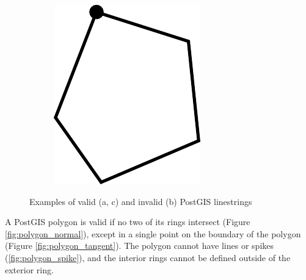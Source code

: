 \begin{figure}[h!]
\begin{subfigure}{.3\textwidth}
  \centering
  \includegraphics[width=.7\linewidth]{images/linestring_closed.pdf}
  \caption{}
  \label{fig:linestring_closed}
\end{subfigure}
\caption{Examples of valid (a, c) and invalid (b) PostGIS linestrings}
\label{fig:postgis_linestring}
\end{figure}

A PostGIS polygon is valid if no two of its rings intersect (Figure \ref{fig:polygon_normal}), except in a single point on the boundary of the polygon (Figure \ref{fig:polygon_tangent}). The polygon cannot have lines or spikes (\ref{fig:polygon_spike}), and the interior rings cannot be defined outside of the exterior ring.

